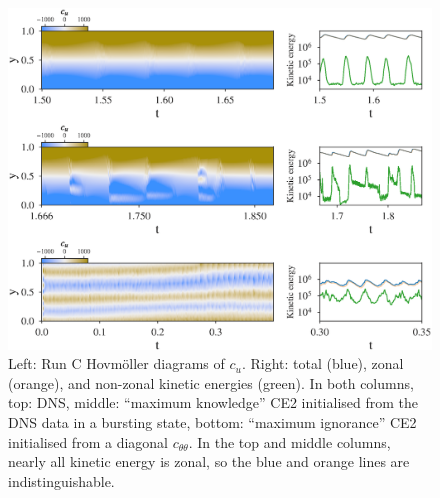 \documentclass{jfm}
\newcommand{\cu}{c_u}
\newcommand{\ctt}{c_{\theta \theta}}
\begin{document}
\begin{figure}
  \centering
  \includegraphics[width=\textwidth]{fig5.eps}
  \caption{ Left: Run C Hovm\"oller diagrams of $\cu$. Right: total (blue), zonal (orange), and non-zonal kinetic energies (green). In both columns, top: DNS, middle: ``maximum knowledge'' CE2 initialised from the DNS data in a bursting state, bottom: ``maximum ignorance'' CE2 initialised from a diagonal $\ctt$. In the top and middle columns, nearly all kinetic energy is zonal, so the blue and orange lines are indistinguishable.}
  \label{fig:run_C}
\end{figure}
\end{document}

